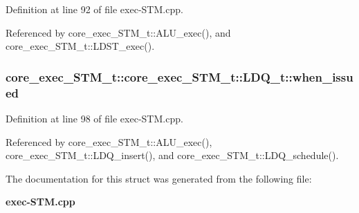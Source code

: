 Definition at line 92 of file exec-STM.cpp.

Referenced by core\_\-exec\_\-STM\_\-t::ALU\_\-exec(), and core\_\-exec\_\-STM\_\-t::LDST\_\-exec().
\subsubsection[{when\_\-issued}]{ core\_\-exec\_\-STM\_\-t::core\_\-exec\_\-STM\_\-t::LDQ\_\-t::when\_\-issued}\label{structcore__exec__STM__t_1_1LDQ__t_e19d8086d46fb88fde8b80517826e909}




Definition at line 98 of file exec-STM.cpp.

Referenced by core\_\-exec\_\-STM\_\-t::ALU\_\-exec(), core\_\-exec\_\-STM\_\-t::LDQ\_\-insert(), and core\_\-exec\_\-STM\_\-t::LDQ\_\-schedule().

The documentation for this struct was generated from the following file:\begin{CompactItemize}
\item 
{\bf exec-STM.cpp}\end{CompactItemize}
